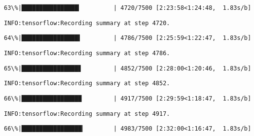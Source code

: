 \documentclass[11pt]{article}
\begin{document}
    \begin{Verbatim}[commandchars=\\\{\}]
 63\%|████████████████▎         | 4720/7500 [2:23:58<1:24:48,  1.83s/b]
    \end{Verbatim}

    \begin{Verbatim}[commandchars=\\\{\}]
INFO:tensorflow:Recording summary at step 4720.

    \end{Verbatim}

    \begin{Verbatim}[commandchars=\\\{\}]
 64\%|████████████████▌         | 4786/7500 [2:25:59<1:22:47,  1.83s/b]
    \end{Verbatim}

    \begin{Verbatim}[commandchars=\\\{\}]
INFO:tensorflow:Recording summary at step 4786.

    \end{Verbatim}

    \begin{Verbatim}[commandchars=\\\{\}]
 65\%|████████████████▊         | 4852/7500 [2:28:00<1:20:46,  1.83s/b]
    \end{Verbatim}

    \begin{Verbatim}[commandchars=\\\{\}]
INFO:tensorflow:Recording summary at step 4852.

    \end{Verbatim}

    \begin{Verbatim}[commandchars=\\\{\}]
 66\%|█████████████████         | 4917/7500 [2:29:59<1:18:47,  1.83s/b]
    \end{Verbatim}

    \begin{Verbatim}[commandchars=\\\{\}]
INFO:tensorflow:Recording summary at step 4917.

    \end{Verbatim}

    \begin{Verbatim}[commandchars=\\\{\}]
 66\%|█████████████████▎        | 4983/7500 [2:32:00<1:16:47,  1.83s/b]
    \end{Verbatim}
\end{document}
